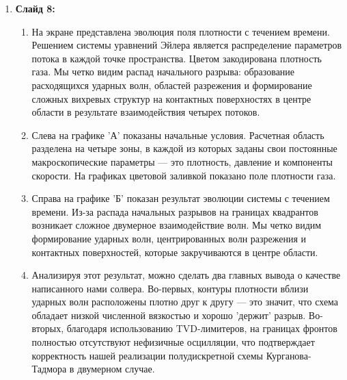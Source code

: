 \documentclass[12pt, a4paper]{article}
\theoremstyle{gostdef}
\begin{document}
\begin{enumerate}
\begin{enumerate}
			\item Ключевая особенность схемы KT кроется в коэффициенте $a$. Это максимальная локальная скорость распространения волны на данной границе. Благодаря использованию именно локальной скорости, схема вносит ровно столько искусственной вязкости, сколько нужно для стабильности, не "размазывая" решение.
			\item Подставив потоки в исходное уравнение, мы получаем систему обыкновенных дифференциальных уравнений по времени. Ее мы решаем с помощью метода Рунге-Кутты второго порядка, сохраняющего свойство TVD. Важно отметить, что благодаря библиотеке JAX, расчет потоков по всей сетке векторизован и выполняется одновременно.
		\end{enumerate}
		\item \textbf{Слайд 8:}
		\begin{enumerate}
			\item На экране представлена эволюция поля плотности с течением времени. Решением системы уравнений Эйлера является распределение параметров потока в каждой точке пространства. Цветом закодирована плотность газа. Мы четко видим распад начального разрыва: образование расходящихся ударных волн, областей разрежения и формирование сложных вихревых структур на контактных поверхностях в центре области в результате взаимодействия четырех потоков.
			\item Слева на графике 'А' показаны начальные условия. Расчетная область разделена на четыре зоны, в каждой из которых заданы свои постоянные макроскопические параметры — это плотность, давление и компоненты скорости. На графиках цветовой заливкой показано поле плотности газа.
			\item Справа на графике 'Б' показан результат эволюции системы с течением времени. Из-за распада начальных разрывов на границах квадрантов возникает сложное двумерное взаимодействие волн. Мы четко видим формирование ударных волн, центрированных волн разрежения и контактных поверхностей, которые закручиваются в центре области.
			\item Анализируя этот результат, можно сделать два главных вывода о качестве написанного нами солвера. Во-первых, контуры плотности вблизи ударных волн расположены плотно друг к другу — это значит, что схема обладает низкой численной вязкостью и хорошо 'держит' разрыв. Во-вторых, благодаря использованию TVD-лимитеров, на границах фронтов полностью отсутствуют нефизичные осцилляции, что подтверждает корректность нашей реализации полудискретной схемы Курганова-Тадмора в двумерном случае.

\end{enumerate}
\end{enumerate}
\end{document}
